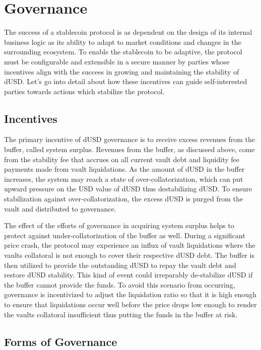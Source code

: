 \documentclass[12pt]{article}
\begin{document}
\section{Governance}

The success of a stablecoin protocol is as dependent on the design of its internal business logic as its ability to adapt to market conditions and changes in the surrounding ecosystem. To enable the stablecoin to be adaptive, the protocol must be configurable and extensible in a secure manner by parties whose incentives align with the succees in growing and maintaining the stability of dUSD. Let's go into detail about how these incentives can guide self-interested parties towards actions which stabilize the protocol.

\subsection{Incentives}

The primary incentive of dUSD governance is to receive excess revenues from the buffer, called system surplus. Revenues from the buffer, as discussed above, come from the stability fee that accrues on all current vault debt and liquidity fee payments made from vault liquidations. As the amount of dUSD in the buffer increases, the system may reach a state of over-collatorization, which can put upward pressure on the USD value of dUSD thus destabilizing dUSD. To ensure stabilization against over-collatorization, the excess dUSD is purged from the vault and distributed to governance.

The effect of the efforts of governance in acquiring system surplus helps to protect against under-collatorization of the buffer as well. During a significant price crash, the protocol may experience an influx of vault liquidations where the vaults collatoral is not enough to cover their respective dUSD debt. The buffer is then utilized to provide the outstanding dUSD to repay the vault debt and restore dUSD stability. This kind of event could irreparably de-stabilize dUSD if the buffer cannot provide the funds. To avoid this scenario from occurring, governance is incentivized to adjust the liquidation ratio so that it is high enough to ensure that liquidations occur well before the price drops low enough to render the vaults collatoral insufficient thus putting the funds in the buffer at risk.

\subsection{Forms of Governance}
\end{document}
